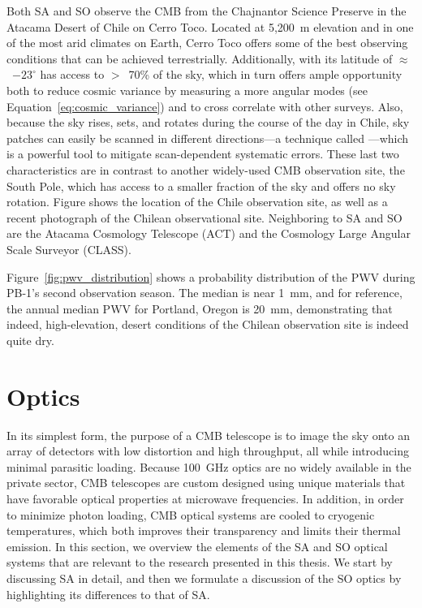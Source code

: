 Both SA and SO observe the CMB from the Chajnantor Science Preserve in the Atacama Desert of Chile on Cerro Toco. Located at 5,200~m elevation and in one of the most arid climates on Earth, Cerro Toco offers some of the best observing conditions that can be achieved terrestrially. Additionally, with its latitude of $\approx$~$-23^{\circ}$ has access to $>$~70\% of the sky, which in turn offers ample opportunity both to reduce cosmic variance by measuring a more angular modes (see Equation~\ref{eq:cosmic_variance}) and to cross correlate with other surveys. Also, because the sky rises, sets, and rotates during the course of the day in Chile, sky patches can easily be scanned in different directions---a technique called ---which is a powerful tool to mitigate scan-dependent systematic errors. These last two characteristics are in contrast to another widely-used CMB observation site, the South Pole, which has access to a smaller fraction of the sky and offers no sky rotation. Figure shows the location of the Chile observation site, as well as a recent photograph of the Chilean observational site. Neighboring to SA and SO are the Atacama Cosmology Telescope (ACT) and the Cosmology Large Angular Scale Surveyor (CLASS).

Figure~\ref{fig:pwv_distribution} shows a probability distribution of the PWV during PB-1's second observation season. The median is near 1~mm, and for reference, the annual median PWV for Portland, Oregon is 20~mm, demonstrating that indeed, high-elevation, desert conditions of the Chilean observation site is indeed quite dry.


\section{Optics}
\label{sec:simons_array_optics}

In its simplest form, the purpose of a CMB telescope is to image the sky onto an array of detectors with low distortion and high throughput, all while introducing minimal parasitic loading. Because 100~GHz optics are no widely available in the private sector, CMB telescopes are custom designed using unique materials that have favorable optical properties at microwave frequencies. In addition, in order to minimize photon loading, CMB optical systems are cooled to cryogenic temperatures, which both improves their transparency and limits their thermal emission. In this section, we overview the elements of the SA and SO optical systems that are relevant to the research presented in this thesis. We start by discussing SA in detail, and then we formulate a discussion of the SO optics by highlighting its differences to that of SA.

